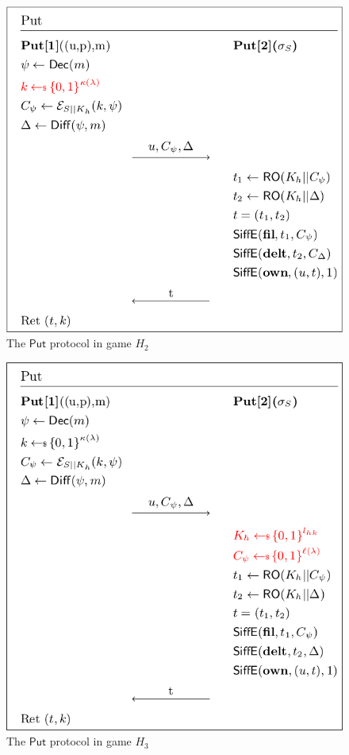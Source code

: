 \begin{figure}
	\centering
	\includegraphics[scale=0.4]{H2}
	\caption{The $\mathsf{Put}$ protocol in game $H_2$}
\end{figure}

\begin{figure}
	\centering
	\includegraphics[scale=0.4]{H3}
	\caption{The $\mathsf{Put}$ protocol in game $H_3$}
\end{figure}

